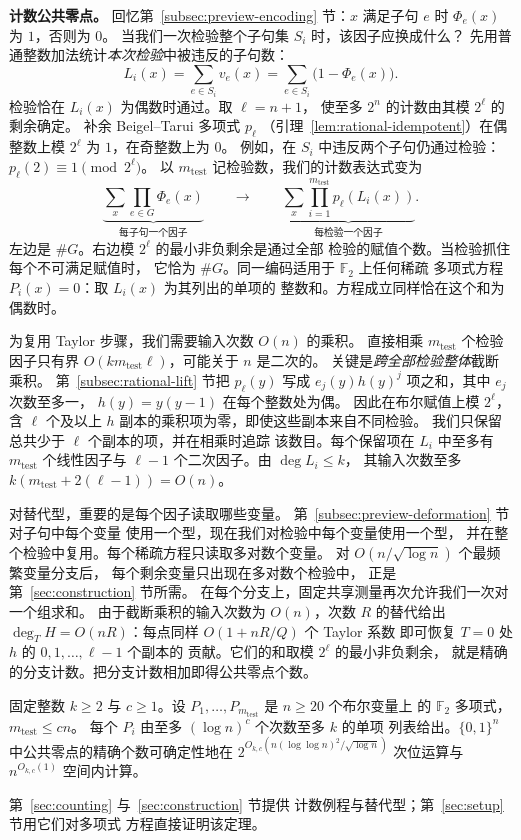 \medskip\noindent
\textbf{计数公共零点。}
回忆第~\ref{subsec:preview-encoding} 节：$x$ 满足子句
$e$ 时 $\Phi_e(x)$ 为 $1$，否则为 $0$。
当我们一次检验整个子句集 $S_i$ 时，该因子应换成什么？
先用普通整数加法统计\emph{本次检验}中被违反的子句数：
\[
 L_i(x)=\sum_{e\in S_i}v_e(x)=\sum_{e\in S_i}\bigl(1-\Phi_e(x)\bigr).
\]
检验恰在 $L_i(x)$ 为偶数时通过。取 $\ell=n+1$，
使至多 $2^n$ 的计数由其模 $2^\ell$ 的剩余确定。
补余 Beigel--Tarui 多项式 $p_\ell$
（引理~\ref{lem:rational-idempotent}）在偶整数上模
$2^\ell$ 为 $1$，在奇整数上为 $0$。
例如，在 $S_i$ 中违反两个子句仍通过检验：
$p_\ell(2)\equiv1\pmod{2^\ell}$。
以 $m_{\mathrm{test}}$ 记检验数，我们的计数表达式变为
\[
 \underbrace{\sum_x\prod_{e\in G}\Phi_e(x)}_{\text{每子句一个因子}}
 \qquad\longrightarrow\qquad
 \underbrace{\sum_x\prod_{i=1}^{m_{\mathrm{test}}} p_\ell(L_i(x))}_{\text{每检验一个因子}}.
\]
左边是 $\#G$。右边模 $2^\ell$ 的最小非负剩余是通过全部
检验的赋值个数。当检验抓住每个不可满足赋值时，
它恰为 $\#G$。同一编码适用于 $\mathbb F_2$ 上任何稀疏
多项式方程 $P_i(x)=0$：取 $L_i(x)$ 为其列出的单项的
整数和。方程成立同样恰在这个和为偶数时。

为复用 Taylor 步骤，我们需要输入次数 $O(n)$ 的乘积。
直接相乘 $m_{\mathrm{test}}$ 个检验因子只有界
$O(km_{\mathrm{test}}\ell)$，可能关于 $n$ 是二次的。
关键是\emph{跨全部检验整体}截断乘积。
第~\ref{subsec:rational-lift} 节把 $p_\ell(y)$ 写成
$e_j(y)h(y)^j$ 项之和，其中 $e_j$ 次数至多一，
$h(y)=y(y-1)$ 在每个整数处为偶。
因此在布尔赋值上模 $2^\ell$，含 $\ell$ 个及以上 $h$
副本的乘积项为零，即使这些副本来自不同检验。
我们只保留总共少于 $\ell$ 个副本的项，并在相乘时追踪
该数目。每个保留项在 $L_i$ 中至多有 $m_{\mathrm{test}}$
个线性因子与 $\ell-1$ 个二次因子。由 $\deg L_i\le k$，
其输入次数至多 $k(m_{\mathrm{test}}+2(\ell-1))=O(n)$。

对替代型，重要的是每个因子读取哪些变量。
第~\ref{subsec:preview-deformation} 节对子句中每个变量
使用一个型，现在我们对检验中每个变量使用一个型，
并在整个检验中复用。每个稀疏方程只读取多对数个变量。
对 $O(n/\sqrt{\log n})$ 个最频繁变量分支后，
每个剩余变量只出现在多对数个检验中，
正是第~\ref{sec:construction} 节所需。
在每个分支上，固定共享测量再次允许我们一次对一个组求和。
由于截断乘积的输入次数为 $O(n)$，次数 $R$ 的替代给出
$\deg_T H=O(nR)$：每点同样 $O(1+nR/Q)$ 个 Taylor 系数
即可恢复 $T=0$ 处 $h$ 的 $0,1,\ldots,\ell-1$ 个副本的
贡献。它们的和取模 $2^\ell$ 的最小非负剩余，
就是精确的分支计数。把分支计数相加即得公共零点个数。

\begin{theorem}[稀疏多项式公共零点的计数]
\label{thm:overview-sparse-polynomials}
固定整数 $k\ge2$ 与 $c\ge1$。设
$P_1,\ldots,P_{m_{\mathrm{test}}}$ 是 $n\ge20$ 个布尔变量上
的 $\mathbb F_2$ 多项式，$m_{\mathrm{test}}\le cn$。
每个 $P_i$ 由至多 $(\log n)^c$ 个次数至多 $k$ 的单项
列表给出。$\{0,1\}^n$ 中公共零点的精确个数可确定性地在
$2^{O_{k,c}(n(\log\log n)^2/\sqrt{\log n})}$ 次位运算与
$n^{O_{k,c}(1)}$ 空间内计算。
\end{theorem}
第~\ref{sec:counting} 与~\ref{sec:construction} 节提供
计数例程与替代型；第~\ref{sec:setup} 节用它们对多项式
方程直接证明该定理。

